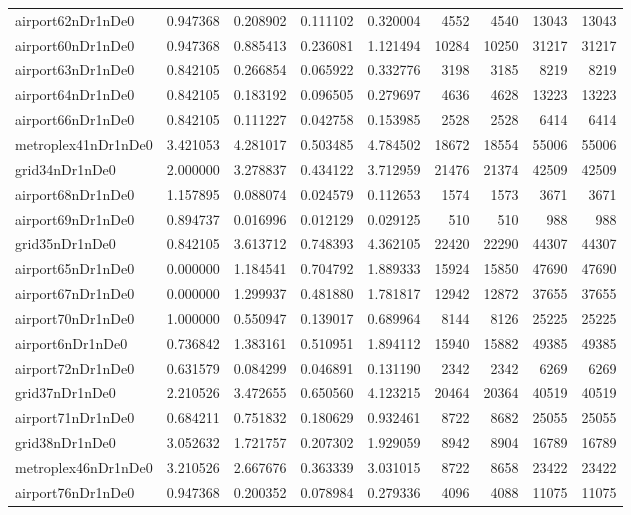 \begin{longtable}{|l|r|r|r|r|r|r|r|r|}
airport62nDr1nDe0 & 0.947368 & 0.208902 & 0.111102 & 0.320004 & 4552 & 4540 & 13043 & 13043 \\
airport60nDr1nDe0 & 0.947368 & 0.885413 & 0.236081 & 1.121494 & 10284 & 10250 & 31217 & 31217 \\
airport63nDr1nDe0 & 0.842105 & 0.266854 & 0.065922 & 0.332776 & 3198 & 3185 & 8219 & 8219 \\
airport64nDr1nDe0 & 0.842105 & 0.183192 & 0.096505 & 0.279697 & 4636 & 4628 & 13223 & 13223 \\
airport66nDr1nDe0 & 0.842105 & 0.111227 & 0.042758 & 0.153985 & 2528 & 2528 & 6414 & 6414 \\
metroplex41nDr1nDe0 & 3.421053 & 4.281017 & 0.503485 & 4.784502 & 18672 & 18554 & 55006 & 55006 \\
grid34nDr1nDe0 & 2.000000 & 3.278837 & 0.434122 & 3.712959 & 21476 & 21374 & 42509 & 42509 \\
airport68nDr1nDe0 & 1.157895 & 0.088074 & 0.024579 & 0.112653 & 1574 & 1573 & 3671 & 3671 \\
airport69nDr1nDe0 & 0.894737 & 0.016996 & 0.012129 & 0.029125 & 510 & 510 & 988 & 988 \\
grid35nDr1nDe0 & 0.842105 & 3.613712 & 0.748393 & 4.362105 & 22420 & 22290 & 44307 & 44307 \\
airport65nDr1nDe0 & 0.000000 & 1.184541 & 0.704792 & 1.889333 & 15924 & 15850 & 47690 & 47690 \\
airport67nDr1nDe0 & 0.000000 & 1.299937 & 0.481880 & 1.781817 & 12942 & 12872 & 37655 & 37655 \\
airport70nDr1nDe0 & 1.000000 & 0.550947 & 0.139017 & 0.689964 & 8144 & 8126 & 25225 & 25225 \\
airport6nDr1nDe0 & 0.736842 & 1.383161 & 0.510951 & 1.894112 & 15940 & 15882 & 49385 & 49385 \\
airport72nDr1nDe0 & 0.631579 & 0.084299 & 0.046891 & 0.131190 & 2342 & 2342 & 6269 & 6269 \\
grid37nDr1nDe0 & 2.210526 & 3.472655 & 0.650560 & 4.123215 & 20464 & 20364 & 40519 & 40519 \\
airport71nDr1nDe0 & 0.684211 & 0.751832 & 0.180629 & 0.932461 & 8722 & 8682 & 25055 & 25055 \\
grid38nDr1nDe0 & 3.052632 & 1.721757 & 0.207302 & 1.929059 & 8942 & 8904 & 16789 & 16789 \\
metroplex46nDr1nDe0 & 3.210526 & 2.667676 & 0.363339 & 3.031015 & 8722 & 8658 & 23422 & 23422 \\
airport76nDr1nDe0 & 0.947368 & 0.200352 & 0.078984 & 0.279336 & 4096 & 4088 & 11075 & 11075 \\

\end{longtable}

